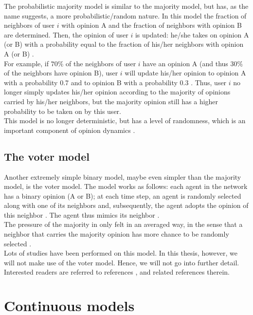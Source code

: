 \documentclass[11 pt , letterpaper , twoside , openright]{book}
\begin{document}
The probabilistic majority model is similar to the majority model, but has, as the name suggests, a more probabilistic/random nature. In this model the fraction of neighbors of user $i$ with opinion A and the fraction of neighbors with opinion B are determined. Then, the opinion of user $i$ is updated: he/she takes on opinion A (or B) with a probability equal to the fraction of his/her neighbors with opinion A (or B) \cite{Perra2019}.\\
\newpage
\noindent
For example, if $70\%$ of the neighbors of user $i$ have an opinion A (and thus $30 \%$ of the neighbors have opinion B), user $i$ will update his/her opinion to opinion A with a probability 0.7 and to opinion B with a probability 0.3 \cite{Perra2019}. Thus, user $i$ no longer simply updates his/her opinion according to the majority of opinions carried by his/her neighbors, but the majority opinion still has a higher probability to be taken on by this user.\\
This model is no longer deterministic, but has a level of randomness, which is an important component of opinion dynamics \cite{Perra2019}. 

\subsection{The voter model}

Another extremely simple binary model, maybe even simpler than the majority model, is the voter model. The model works as follows: each agent in the network has a binary opinion (A or B); at each time step, an agent is randomly selected along with one of its neighbors and, subsequently, the agent adopts the opinion of this neighbor \cite{Castellano2009}. The agent thus mimics its neighbor \cite{Castellano2009}. \\
The pressure of the majority in only felt in an averaged way, in the sense that a neighbor that carries the majority opinion has more chance to be randomly selected \cite{Castellano2009}.\\
Lots of studies have been performed on this model. In this thesis, however, we will not make use of the voter model. Hence, we will not go into further detail. Interested readers are referred to references \cite{Castellano2009}, \cite{Fernandez2014} and related references therein.%


\section{Continuous models}\label{Con}
\end{document}
